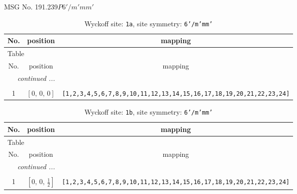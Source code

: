 \documentclass[fleqn,8pt]{jsarticle}
\begin{document}
\setcounter{MaxMatrixCols}{32}

\renewcommand{\tablename}{Table~}
\renewcommand{\figurename}{Figure~}
\begin{center}
\LARGE
MSG No. 191.239\quad$P6'/m'mm'$
\end{center}
\renewcommand{\arraystretch}{1.2}
\begin{longtable}{ccc}
\caption{Wyckoff site: {\tt 1a}, site symmetry: {\tt 6'/m'mm'}}
 \\
 \hline \hline
No. & position & mapping \\ \hline \endfirsthead

\multicolumn{2}{l}{\tablename\ \thetable{}} \\
 \hline \hline
No. & position & mapping \\ \hline \endhead

 \hline \hline
\multicolumn{2}{r}{\footnotesize\it continued ...} \\ \endfoot

 \hline \hline
\multicolumn{2}{r}{} \\ \endlastfoot

1 & $\left[ 0,\, 0,\, 0 \right]$ & {\tt [1,2,3,4,5,6,7,8,9,10,11,12,13,14,15,16,17,18,19,20,21,22,23,24]} \\
\end{longtable}
\renewcommand{\arraystretch}{1.2}
\begin{longtable}{ccc}
\caption{Wyckoff site: {\tt 1b}, site symmetry: {\tt 6'/m'mm'}}
 \\
 \hline \hline
No. & position & mapping \\ \hline \endfirsthead

\multicolumn{2}{l}{\tablename\ \thetable{}} \\
 \hline \hline
No. & position & mapping \\ \hline \endhead

 \hline \hline
\multicolumn{2}{r}{\footnotesize\it continued ...} \\ \endfoot

 \hline \hline
\multicolumn{2}{r}{} \\ \endlastfoot

1 & $\left[ 0,\, 0,\, \frac{1}{2} \right]$ & {\tt [1,2,3,4,5,6,7,8,9,10,11,12,13,14,15,16,17,18,19,20,21,22,23,24]} \\
\end{longtable}
\renewcommand{\arraystretch}{1.2}
\end{document}
